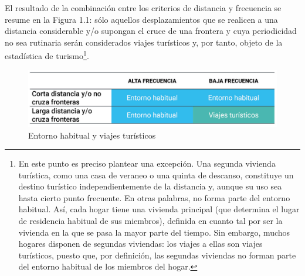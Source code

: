 \documentclass[
  openany]{book}
\begin{document}
El resultado de la combinación entre los criterios de distancia y frecuencia se resume en la Figura 1.1: sólo aquellos desplazamientos que se realicen a una distancia considerable y/o supongan el cruce de una frontera y cuya periodicidad no sea rutinaria serán considerados viajes turísticos y, por tanto, objeto de la estadística de turismo\footnote{En este punto es preciso plantear una excepción. Una segunda vivienda turística, como una casa de veraneo o una quinta de descanso, constituye un destino turístico independientemente de la distancia y, aunque su uso sea hasta cierto punto frecuente. En otras palabras, no forma parte del entorno habitual. Así, cada hogar tiene una vivienda principal (que determina el lugar de residencia habitual de sus miembros), definida en cuanto tal por ser la vivienda en la que se pasa la mayor parte del tiempo. Sin embargo, muchos hogares disponen de segundas viviendas: los viajes a ellas son viajes turísticos, puesto que, por definición, las segundas viviendas no forman parte del entorno habitual de los miembros del hogar.}.

\begin{figure}

{\centering \includegraphics[width=1\linewidth]{imagenes/figura1.1} 

}

\caption{Entorno habitual y viajes turísticos}\label{fig:entornoYviajes}
\end{figure}
\end{document}
